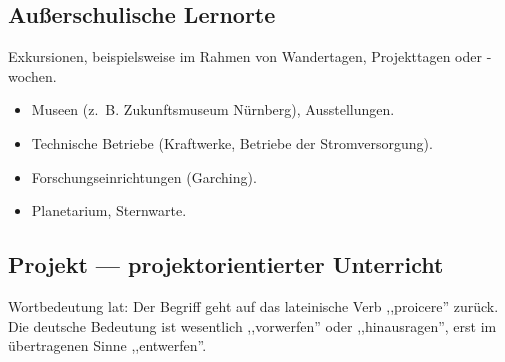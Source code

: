 \subsection{Au{\ss}erschulische Lernorte}

Exkursionen, beispielsweise im Rahmen von Wandertagen,
Projekttagen oder -wochen.

\begin{beisp}
	\begin{itemize}
\item Museen (z.~B. Zukunftsmuseum Nürnberg), Ausstellungen.
\item Technische Betriebe
(Kraftwerke, Betriebe der Stromversorgung).
\item Forschungseinrichtungen (Garching).
\item Planetarium, Sternwarte.
\end{itemize}
\end{beisp}



\subsection{Projekt --- projektorientierter Unterricht}

Wortbedeutung lat: Der Begriff geht auf das lateinische Verb
,,proicere'' zur\"{u}ck.
Die deutsche Bedeutung ist wesentlich ,,vorwerfen'' oder
,,hinausragen'', erst im \"{u}bertragenen Sinne ,,entwerfen''.


